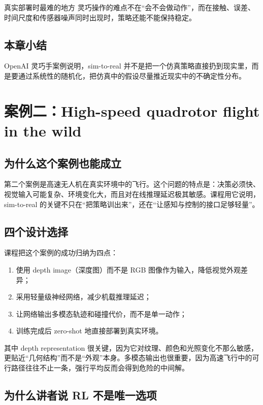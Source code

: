 \documentclass[a4paper]{article}
\begin{document}
\begin{importantbox}{真实部署时最难的地方}
灵巧操作的难点不在“会不会做动作”，而在接触、误差、时间尺度和传感器噪声同时出现时，策略还能不能保持稳定。
\end{importantbox}

\subsection{本章小结}

OpenAI 灵巧手案例说明，sim-to-real 并不是把一个仿真策略直接扔到现实里，而是要通过系统性的随机化，把仿真中的假设尽量推近现实中的不确定性分布。

\section{案例二：High-speed quadrotor flight in the wild}

\subsection{为什么这个案例也能成立}

第二个案例是高速无人机在真实环境中的飞行。这个问题的特点是：决策必须快、视觉输入可能复杂、环境变化大，而且对在线推理延迟极其敏感。课程用它说明，sim-to-real 的关键不只在“把策略训出来”，还在“让感知与控制的接口足够轻量”。

\subsection{四个设计选择}

课程把这个案例的成功归纳为四点：
\begin{enumerate}
  \item 使用 depth image（深度图）而不是 RGB 图像作为输入，降低视觉外观差异；
  \item 采用轻量级神经网络，减少机载推理延迟；
  \item 让网络输出多模态轨迹和碰撞代价，而不是单一动作；
  \item 训练完成后 zero-shot 地直接部署到真实环境。
\end{enumerate}

其中 depth representation 很关键，因为它对纹理、颜色和光照变化不那么敏感，更贴近“几何结构”而不是“外观”本身。多模态输出也很重要，因为高速飞行中的可行路径往往不止一条，强行平均反而会得到危险的中间解。

\subsection{为什么讲者说 RL 不是唯一选项}
\end{document}
